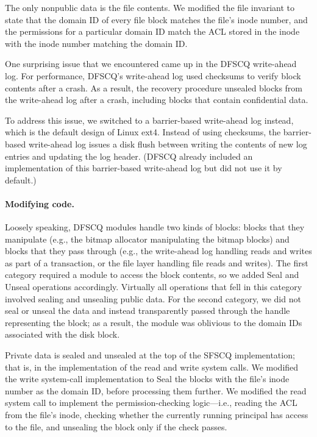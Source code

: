 The only nonpublic data is the file contents.  We modified the file
invariant to state that the domain ID of every file block matches the
file's inode number, and the permissions for a particular domain ID match
the ACL stored in the inode with the inode number matching the domain ID\@.

One surprising issue that we encountered came up in the DFSCQ write-ahead
log.  For performance, DFSCQ's write-ahead log used checksums to verify
block contents after a crash.  As a result, the recovery procedure
unsealed blocks from the write-ahead log after a crash, including blocks
that contain confidential data.

To address this issue, we switched to a barrier-based write-ahead log
instead, which is the default design of Linux ext4.  Instead of using
checksums, the barrier-based write-ahead log issues a disk flush between
writing the contents of new log entries and updating the log header.
(DFSCQ already included an implementation of this barrier-based
write-ahead log but did not use it by default.)


\paragraph{Modifying code.}

Loosely speaking, DFSCQ modules handle two kinds of blocks: blocks that
they manipulate (e.g., the bitmap allocator manipulating the bitmap
blocks) and blocks that they pass through (e.g., the write-ahead log
handling reads and writes as part of a transaction, or the file layer
handling file reads and writes).  The first category required a module
to access the block contents, so we added {Seal} and {Unseal}
operations accordingly.  Virtually all operations that fell in this
category involved sealing and unsealing public data.  For the second
category, we did not seal or unseal the data and instead transparently
passed through the handle representing the block; as a result, the module
was oblivious to the domain IDs associated with the disk block.

Private data is sealed and unsealed at the top of the SFSCQ
implementation; that is, in the implementation of the {read}
and {write} system calls.  We modified the {write} system-call
implementation to {Seal} the blocks with the file's inode number
as the domain ID, before processing them further.
We modified the {read} system call to implement the
permission-checking logic---i.e., reading the ACL from the file's inode,
checking whether the currently running principal has access to the file,
and unsealing the block only if the check passes.


